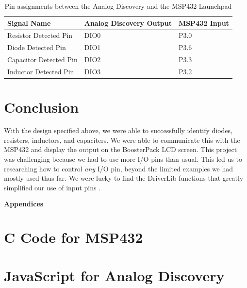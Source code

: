 \documentclass[12pt]{article}
\begin{document}
\begin{table}[H]
\begin{center}
\begin{tabular}{| l | l | l |}
	\hline
	\textbf{Signal Name} & \textbf{Analog Discovery Output} & \textbf{MSP432 Input} \\ \hline
	Resistor Detected Pin & DIO0 & P3.0 \\ \hline
	Diode Detected Pin & DIO1 & P3.6  \\ \hline
	Capacitor Detected Pin & DIO2 & P3.3 \\ \hline
	Inductor Detected Pin & DIO3 & P3.2  \\ \hline
\end{tabular}
\caption{\label{tab:pins}Pin assignments between the Analog Discovery and the MSP432 Launchpad}
\end{center}
\end{table}

\section{Conclusion}

With the design specified above, we were able to successfully identify diodes, resisters, inductors, and capaciters. We were able to communicate this with the MSP432 and display the output on the BoosterPack LCD screen. This project was challenging because we had to use more I/O pins than usual. This led us to researching how to control \textit{any} I/O pin, beyond the limited examples we had mostly used thus far. We were lucky to find the DriverLib functions that greatly simplified our use of input pins \cite{textbook}.

\pagebreak

\textbf{Appendices}

\begin{appendices}

\section{C Code for MSP432}



\section{JavaScript for Analog Discovery}



\end{appendices}
\end{document}
